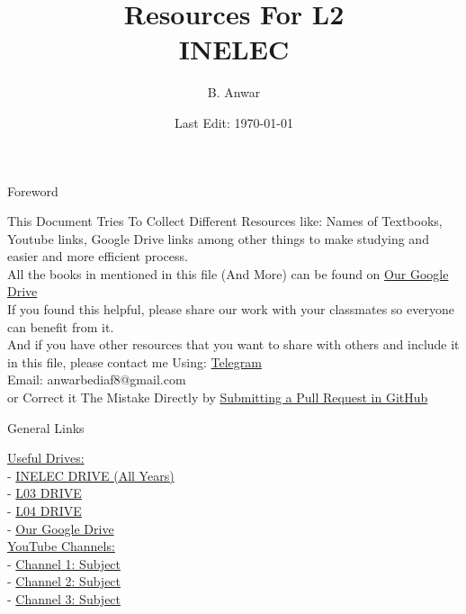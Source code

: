 \documentclass{article}
\author{B. Anwar}
\title{Resources For L2 \\ INELEC}
\date{Last Edit: \today}
\begin{document}
  
\maketitle

\newpage
\begin{center}
    \Huge Foreword
\end{center}

\indent This Document Tries To Collect Different Resources like: Names of Textbooks, Youtube links, Google Drive links among other things to make studying and easier and more efficient process.\\

All the books in mentioned in this file (And More) can be found on \href{https://drive.google.com/drive/u/0/folders/1CWgKqywhDzqRSvL7jl189d54OyrJS_s1}{Our Google Drive}\\

If you found this helpful, please share our work with your classmates so everyone can benefit from it.\\

And if you have other resources that you want to share with others and include it in this file, please contact me Using:
\href{https://t.me/anwarbediaf}{Telegram} \\
Email: \color{cyan} anwarbediaf8@gmail.com \color{black}  \\ or 
Correct it The Mistake Directly by \href{https://github.com/Anwar1663/INELEC/}{Submitting a Pull Request in GitHub}

\newpage
\begin{center}
    \huge General Links
\end{center}
\underline{\Large Useful Drives:}\\ [.15cm]
 - \href{https://drive.google.com/drive/u/0/folders/1xHYLk9QP8jp-y56j3HuCtZm0zY7AbnHj}{INELEC DRIVE (All Years)}\\
 - \href{https://drive.google.com/drive/u/0/folders/11Va9waxilcsSdgR665WacbD1JFjO4703}{L03 DRIVE}\\
 - \href{https://drive.google.com/drive/u/0/folders/1wHUM_XDeau1BH4eceBJuJ1M2bLB564QF}{L04 DRIVE}\\
 - \href{https://drive.google.com/drive/u/0/folders/1CWgKqywhDzqRSvL7jl189d54OyrJS_s1}{Our Google Drive}\\

\noindent \underline{\large YouTube Channels:} \\ [.15cm]
 - \href{URL}{Channel 1: Subject}\\
 - \href{URL}{Channel 2: Subject}\\
 - \href{URL}{Channel 3: Subject}\\
\end{document}
